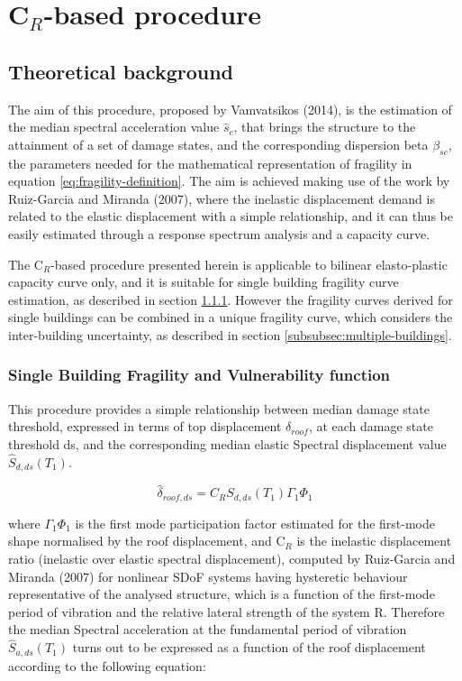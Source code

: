 \section{C$_R$-based procedure}
\label{sec:CR}
\subsection{Theoretical background}
The aim of this procedure, proposed by Vamvatsikos (2014), is the estimation of the median spectral acceleration value $\hat{s}_c$, that brings the structure to the attainment of a set of damage states, and the corresponding dispersion beta $\beta_{sc}$, the parameters needed for the mathematical representation of fragility in equation \ref{eq:fragility-definition}. The aim is achieved making use of the work by Ruiz-Garcia and Miranda (2007), where the inelastic displacement demand is related to the elastic displacement with a simple relationship, and it can thus be easily estimated through a response spectrum analysis and a capacity curve.

The C$_R$-based procedure presented herein is applicable to bilinear elasto-plastic capacity curve only, and it is suitable for single building fragility curve estimation, as described in section \ref{subsubsec:single-building}. However the fragility curves derived for single buildings can be combined in a unique fragility curve, which considers the inter-building uncertainty, as described in section \ref{subsubsec:multiple-buildings}.

\subsubsection{Single Building Fragility and Vulnerability function}
\label{subsubsec:single-building}
This procedure provides a simple relationship between median damage state threshold, expressed in terms of top displacement $\delta_{roof}$, at each damage state threshold ds, and the corresponding median elastic Spectral displacement value $\hat{S}_{d,ds}(T_1)$.

\begin{equation}
\hat{\delta}_{roof, ds} = C_R S_{d, ds}(T_1) \Gamma_1 \Phi_1
\end{equation}

where $\Gamma_1 \Phi_1$ is the first mode participation factor estimated for the first-mode shape normalised by the roof displacement, and C$_R$ is the inelastic displacement ratio (inelastic over elastic spectral displacement), computed by Ruiz-Garcia and Miranda (2007) for nonlinear SDoF systems having hysteretic behaviour representative of the analysed structure, which is a function of the first-mode period of vibration and the relative lateral strength of the system R. Therefore the median Spectral acceleration at the fundamental period of vibration $\hat{S}_{a,ds}(T_1)$ turns out to be expressed as a function of the roof displacement according to the following equation:

